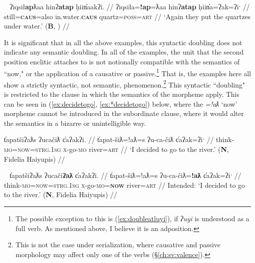 
\begin{comment}
\ex~ \label{ex:doubleatgeneric}
\begingl
\glpreamble ʔayaqḥʔatna huḥtak̓at. //
\gla ʔaya-(q)ḥ=!at=naˑ huḥtak=!at  //
\glb many-\textsc{link}=\textsc{pass}=\textsc{neut.1pl} learn=\textsc{pass} //
\glft `Many know.' (\textbf{B}, Sarah Webster) //
\endgl
\xe
\end{comment}


\ex~ \label{ex:doubleap}
\begingl
\glpreamble ʔiqsił\textbf{ap}ƛaa hinʔ\textbf{atap} ḥiin̓aakʔi.\footnotemark{} //
\gla ʔiqsiła=\textbf{!ap}=ƛaa hinʔ\textbf{atap} ḥiin̓a=ʔak=ʔiˑ  //
\glb still=\textbf{\textsc{caus}}=also in.water.\textbf{\textsc{caus}} quartz=\textsc{poss}=\textsc{art} //
\glft `Again they put the quartzes under water.' (\textbf{B}, \citealt[60]{sapir1955}) //
\endgl
\xe


It is significant that in all the above examples, this syntactic doubling does not indicate any semantic doubling. In all of the examples, the unit that the second position enclitic attaches to is not notionally compatible with the semantics of ``now," or the application of a causative or passive.\footnote{The possible exception to this is (\ref{ex:doubleatluyi}), if \textit{ʔuyi} is understood as a full verb. As mentioned above, I believe it is an adposition.} That is, the examples here all show a strictly syntactic, not semantic, phenomenon.\footnote{This is not the case under serialization, where causative and passive morphology may affect only one of the verbs (\S\ref{ch:sv:valence}).} This syntactic ``doubling" is restricted to the clause in which the semantics of the morpheme apply. This can be seen in (\ref{ex:decidetogo}, \ref{ex:*decidetogo}) below, where the \textit{=!aƛ} `now' morpheme cannot be introduced in the subordinate clause, where it would alter the semantics in a bizarre or unintelligible way.

\ex \label{ex:decidetogo}
\begingl
\glpreamble t̓apatšiʔaƛs ʔucačiƛ c̓aʔakʔi. //
\gla t̓apat-šiƛ=!aƛ=s ʔu-ca-čiƛ c̓aʔak=ʔiˑ //
\glb think-\textsc{mo}=\textsc{now}=\textsc{strg.1sg} \textsc{x}-go-\textsc{mo} river=\textsc{art} //
\glft `I decided to go to the river.' (\textbf{N}, Fidelia Haiyupis) //
\endgl
\xe

\ex~ \label{ex:*decidetogo}
\begingl
\glpreamble *t̓apatšiʔaƛs ʔucači\textbf{ʔaƛ} c̓aʔakʔi. //
\gla *t̓apat-šiƛ=!aƛ=s ʔu-ca-čiƛ=\textbf{!aƛ} c̓aʔak=ʔiˑ //
\glb think-\textsc{mo}=\textsc{now}=\textsc{strg.1sg} \textsc{x}-go-\textsc{mo}=\textbf{\textsc{now}} river=\textsc{art} //
\glft Intended: `I decided to go to the river.' (\textbf{N}, Fidelia Haiyupis) //
\endgl
\xe

